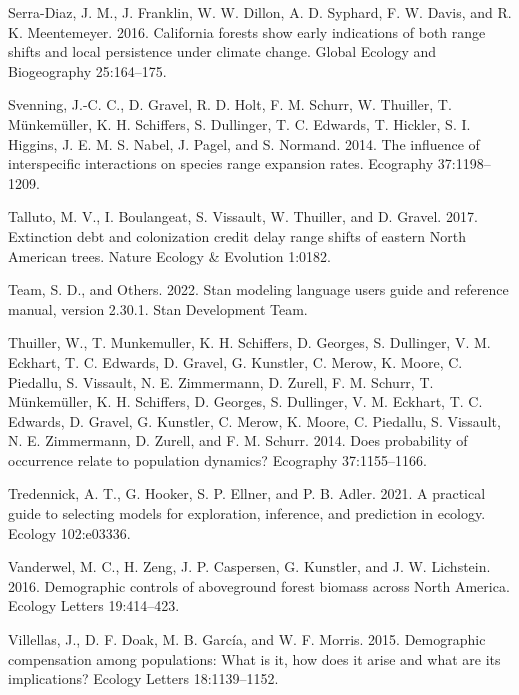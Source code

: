 \documentclass[12pt]{article}
\newlength{\cslhangindent}
\newenvironment{cslreferences}%
  {\setlength{\parindent}{0pt}%
  \everypar{\setlength{\hangindent}{\cslhangindent}}\ignorespaces}%
  {\par}
\begin{document}
\begin{cslreferences}
\leavevmode\hypertarget{ref-SerraDiaz2016}{}%
Serra-Diaz, J. M., J. Franklin, W. W. Dillon, A. D. Syphard, F. W.
Davis, and R. K. Meentemeyer. 2016. California forests show early
indications of both range shifts and local persistence under climate
change. Global Ecology and Biogeography 25:164--175.

\leavevmode\hypertarget{ref-Svenning2014}{}%
Svenning, J.-C. C., D. Gravel, R. D. Holt, F. M. Schurr, W. Thuiller, T.
Münkemüller, K. H. Schiffers, S. Dullinger, T. C. Edwards, T. Hickler,
S. I. Higgins, J. E. M. S. Nabel, J. Pagel, and S. Normand. 2014. The
influence of interspecific interactions on species range expansion
rates. Ecography 37:1198--1209.

\leavevmode\hypertarget{ref-Talluto2017}{}%
Talluto, M. V., I. Boulangeat, S. Vissault, W. Thuiller, and D. Gravel.
2017. Extinction debt and colonization credit delay range shifts of
eastern North American trees. Nature Ecology \& Evolution 1:0182.

\leavevmode\hypertarget{ref-stan2022stan}{}%
Team, S. D., and Others. 2022. Stan modeling language users guide and
reference manual, version 2.30.1. Stan Development Team.

\leavevmode\hypertarget{ref-Thuiller2014}{}%
Thuiller, W., T. Munkemuller, K. H. Schiffers, D. Georges, S. Dullinger,
V. M. Eckhart, T. C. Edwards, D. Gravel, G. Kunstler, C. Merow, K.
Moore, C. Piedallu, S. Vissault, N. E. Zimmermann, D. Zurell, F. M.
Schurr, T. Münkemüller, K. H. Schiffers, D. Georges, S. Dullinger, V. M.
Eckhart, T. C. Edwards, D. Gravel, G. Kunstler, C. Merow, K. Moore, C.
Piedallu, S. Vissault, N. E. Zimmermann, D. Zurell, and F. M. Schurr.
2014. Does probability of occurrence relate to population dynamics?
Ecography 37:1155--1166.

\leavevmode\hypertarget{ref-Tredennick2021}{}%
Tredennick, A. T., G. Hooker, S. P. Ellner, and P. B. Adler. 2021. A
practical guide to selecting models for exploration, inference, and
prediction in ecology. Ecology 102:e03336.

\leavevmode\hypertarget{ref-Vanderwel2016a}{}%
Vanderwel, M. C., H. Zeng, J. P. Caspersen, G. Kunstler, and J. W.
Lichstein. 2016. Demographic controls of aboveground forest biomass
across North America. Ecology Letters 19:414--423.

\leavevmode\hypertarget{ref-Villellas2015}{}%
Villellas, J., D. F. Doak, M. B. García, and W. F. Morris. 2015.
Demographic compensation among populations: What is it, how does it
arise and what are its implications? Ecology Letters 18:1139--1152.


\end{cslreferences}
\end{document}
